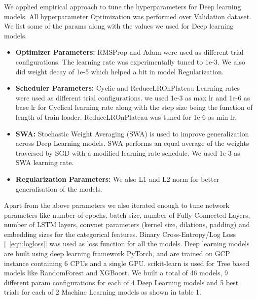 We applied empirical approach to tune the hyperparameters for Deep learning models. All hyperparameter Optimization
was performed over Validation dataset. We list some of the params along with the values we used for Deep learning models.
  \begin{itemize}
    \item {\bf Optimizer Parameters:} RMSProp and Adam were used as different trial configurations. The learning rate 
    was experimentally tuned to 1e-3. We also did weight decay of 1e-5 which helped a bit in model Regularization.
    \item {\bf Scheduler Parameters:} Cyclic and ReduceLROnPlateau Learning rates were used as different trial configurations.
    we used 1e-3 as max lr and 1e-6 as base lr for Cyclical learning rate along with the step size being the function of
    length of train loader. ReduceLROnPlateau was tuned for 1e-6 as min lr.
    \item {\bf SWA:} Stochastic Weight Averaging (SWA) is used to improve generalization across Deep Learning
    models. SWA performs an equal average of the weights traversed by SGD with a modified learning rate schedule. We used 
    1e-3 as SWA learning rate.
    \item {\bf Regularization Parameters:} We also L1 and L2 norm for better generalisation of the models.
  \end{itemize}
Apart from the above parameters we also iterated enough to tune network parameters like number of epochs, batch size, 
number of Fully Connected Layers, number of LSTM layers, convnet parameters (kernel size, dilations, padding)
and embedding sizes for the categorical features. Binary Cross-Entropy/Log Loss [~\ref{eqn:logloss}] was used as loss 
function for all the models. Deep learning models are built using deep learning framework
PyTorch, and are trained on GCP instance containing 6 CPUs and a single GPU. scikit-learn is used for Tree
based models like RandomForest and XGBoost. We built a total of 46 models, 9 different param configurations for each of 4 
Deep Learning models and 5 best trials for each of 2 Machine Learning models as shown in table 1.

